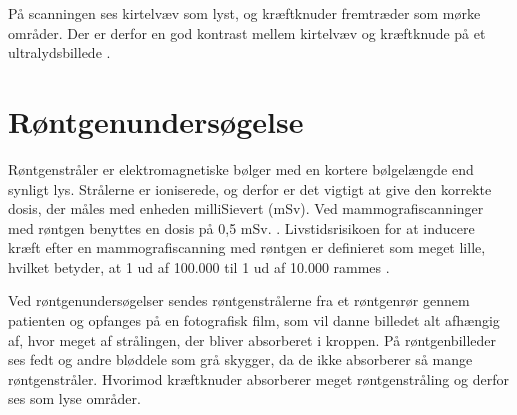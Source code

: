På scanningen ses kirtelvæv som lyst, og kræftknuder fremtræder som mørke områder.  Der er derfor en god kontrast mellem kirtelvæv og kræftknude på et ultralydsbillede \citep{Ultralyd}.

\section{Røntgenundersøgelse}
Røntgenstråler er elektromagnetiske bølger med en kortere bølgelængde end synligt lys. Strålerne er ioniserede, og derfor er det vigtigt at give den korrekte dosis, der måles med enheden milliSievert (mSv). Ved mammografiscanninger med røntgen benyttes en dosis på 0,5 mSv. \cite{Sundhedsstyrelsen}. Livstidsrisikoen for at inducere kræft efter en mammografiscanning med røntgen er definieret som meget lille, hvilket betyder, at 1 ud af 100.000 til 1 ud af 10.000 rammes \cite{Risk}. 

Ved røntgenundersøgelser sendes røntgenstrålerne fra et røntgenrør gennem patienten og opfanges på en fotografisk film, som vil danne billedet alt afhængig af, hvor meget af strålingen, der bliver absorberet i kroppen. På røntgenbilleder ses fedt og andre bløddele som grå skygger, da de ikke absorberer så mange røntgenstråler. Hvorimod kræftknuder absorberer meget røntgenstråling og derfor ses som lyse områder. \cite{Rontgenundersogelse}

